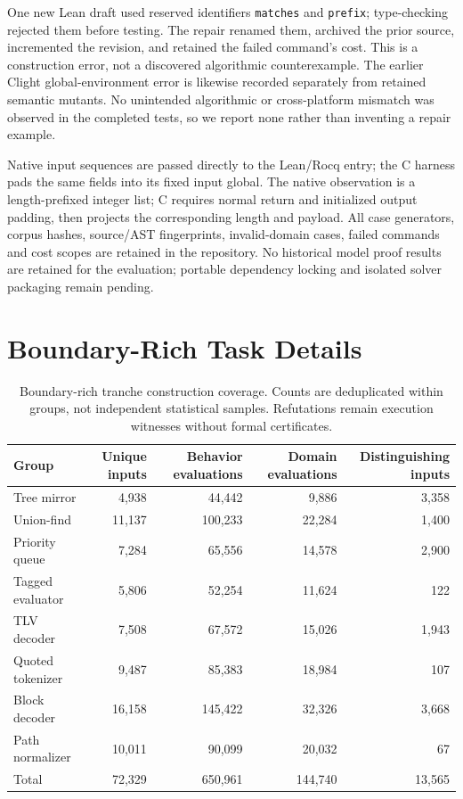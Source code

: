 \documentclass{article}
\begin{document}
One new Lean draft used reserved identifiers \texttt{matches} and \texttt{prefix}; type-checking rejected them before testing. The repair renamed them, archived the prior source, incremented the revision, and retained the failed command's cost. This is a construction error, not a discovered algorithmic counterexample. The earlier Clight global-environment error is likewise recorded separately from retained semantic mutants. No unintended algorithmic or cross-platform mismatch was observed in the completed tests, so we report none rather than inventing a repair example.

Native input sequences are passed directly to the Lean/Rocq entry; the C harness pads the same fields into its fixed input global. The native observation is a length-prefixed integer list; C requires normal return and initialized output padding, then projects the corresponding length and payload. All case generators, corpus hashes, source/AST fingerprints, invalid-domain cases, failed commands and cost scopes are retained in the repository. No historical model proof results are retained for the evaluation; portable dependency locking and isolated solver packaging remain pending.

\section{Boundary-Rich Task Details}

\begin{table}[t]
\centering\small
\caption{Boundary-rich tranche construction coverage. Counts are deduplicated within groups, not independent statistical samples. Refutations remain execution witnesses without formal certificates.}
\begin{tabular}{lrrrr}
\toprule
Group & Unique inputs & Behavior evaluations & Domain evaluations & Distinguishing inputs \\
\midrule
Tree mirror & 4,938 & 44,442 & 9,886 & 3,358 \\
Union-find & 11,137 & 100,233 & 22,284 & 1,400 \\
Priority queue & 7,284 & 65,556 & 14,578 & 2,900 \\
Tagged evaluator & 5,806 & 52,254 & 11,624 & 122 \\
TLV decoder & 7,508 & 67,572 & 15,026 & 1,943 \\
Quoted tokenizer & 9,487 & 85,383 & 18,984 & 107 \\
Block decoder & 16,158 & 145,422 & 32,326 & 3,668 \\
Path normalizer & 10,011 & 90,099 & 20,032 & 67 \\
\midrule
Total & 72,329 & 650,961 & 144,740 & 13,565 \\
\bottomrule
\end{tabular}
\end{table}
\end{document}
